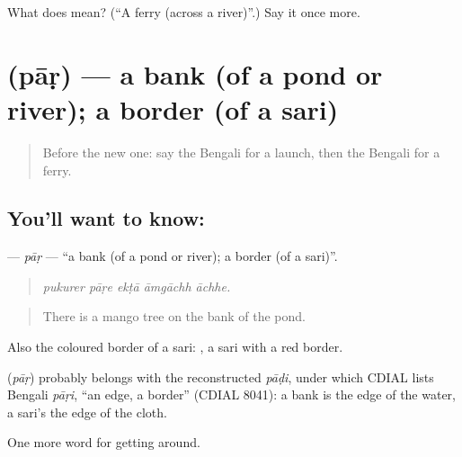 \begin{tcolorbox}[breakable,colback=teal!4,colframe=teal!35!black,title={Before you move on}]
What does  mean? (\textquotedblleft{}A ferry (across a river)\textquotedblright{}.) Say it once more.
\end{tcolorbox}
\section[\texorpdfstring{\bn{পাড়} (pāṛ)}{পাড় (pāṛ)}]{ (pāṛ) — a bank (of a pond or river); a border (of a sari)}

\label{lesson:BN-C397-par}



\begin{quote}
Before the new one: say the Bengali for a launch, then the Bengali for a ferry.
\end{quote}

\subsection*{You'll want to know: }
\textbf{} — \emph{pāṛ} — \textquotedblleft{}a bank (of a pond or river); a border (of a sari)\textquotedblright{}.

\begin{quote}
    
\end{quote}

\begin{quote}
\emph{pukurer pāṛe ekṭā āmgāchh āchhe.}
\end{quote}

\begin{quote}
There is a mango tree on the bank of the pond.
\end{quote}

Also the coloured border of a sari:   , a sari with a red border.

\begin{cousinweb}
\textbf{} (\emph{pāṛ}) probably belongs with the reconstructed \emph{pāḍi}, under which CDIAL lists Bengali \emph{pāṛi}, \textquotedblleft{}an edge, a border\textquotedblright{} (CDIAL 8041): a bank is the edge of the water, a sari's  the edge of the cloth.
\end{cousinweb}

\begin{grammarlens}[title={What you've built}]
One more word for getting around.
\end{grammarlens}

